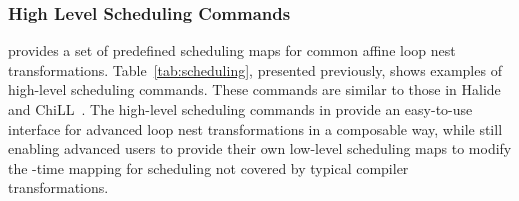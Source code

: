 


\vspace{-0.25cm}
\subsubsection{High Level Scheduling Commands}
\label{sec:scheduling_commands}

\framework provides a set of predefined scheduling maps for common affine loop nest transformations.
Table~\ref{tab:scheduling}, presented previously, shows examples of \framework{} high-level scheduling commands.  These commands are similar to those in Halide~\cite{halide_12} and ChiLL~\cite{chill}.
The high-level scheduling commands in \framework provide an easy-to-use interface for advanced loop nest transformations in a composable way, while still enabling advanced users to provide their own low-level scheduling maps to modify the \processor-time  mapping for scheduling not covered by typical compiler transformations. 

